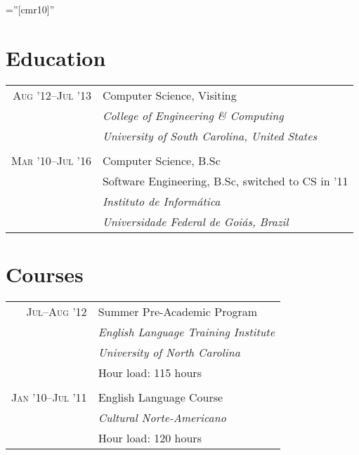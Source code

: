 \documentclass[a4paper,10pt]{article}
\begin{document}
\font\fb=''[cmr10]''


\section{Education}

\begin{tabular}{r|p{11cm}}
  \textsc{Aug '12--Jul '13} & Computer Science, Visiting\\ &
  \emph{College of Engineering \& Computing}\\ &
  \emph{University of South Carolina, United States}
  \\\multicolumn{2}{c}{} \\

  \textsc{Mar '10--Jul '16} & Computer Science, B.Sc\\ &
  Software Engineering, B.Sc, switched to CS in '11\\ &
  \emph{Instituto de Informática}\\ &
  \emph{Universidade Federal de Goiás, Brazil} \\
\end{tabular}

\section{Courses}

\begin{tabular}{r|p{11cm}}
  \textsc{Jul--Aug '12} & Summer Pre-Academic Program\\ &
  \emph{English Language Training Institute}\\ &
  \emph{University of North Carolina}\\ &
  Hour load: 115 hours
  \\\multicolumn{2}{c}{} \\

  \textsc{Jan '10--Jul '11} & English Language Course\\ &
  \emph{Cultural Norte-Americano} \\ &
  Hour load: 120 hours
\end{tabular}
\end{document}
